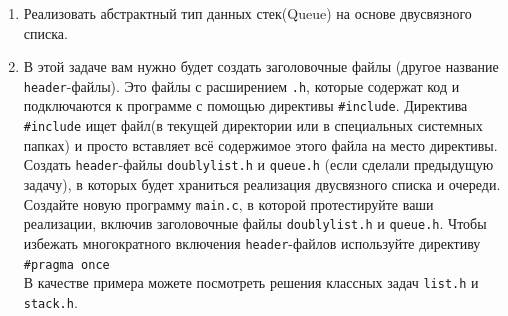 \documentclass{article}
\begin{document}
\begin{enumerate}
\item Реализовать абстрактный тип данных стек(Queue) на основе двусвязного списка.

\item В этой задаче вам нужно будет создать заголовочные файлы (другое название \texttt{header}-файлы). Это файлы с расширением \texttt{.h}, которые содержат код и подключаются к программе с помощью директивы \texttt{\#include}. Директива \texttt{\#include} ищет файл(в текущей директории или в специальных системных папках) и просто вставляет всё содержимое этого файла на место директивы.\\

Создать \texttt{header}-файлы \texttt{doublylist.h} и \texttt{queue.h} (если сделали предыдущую задачу), в которых будет храниться реализация двусвязного списка и очереди. Создайте новую программу \texttt{main.c}, в которой протестируйте ваши реализации, включив заголовочные файлы \texttt{doublylist.h} и \texttt{queue.h}. Чтобы избежать многократного включения \texttt{header}-файлов используйте директиву \\
\texttt{\#pragma once}\\

В качестве примера можете посмотреть решения классных задач \texttt{list.h} и \texttt{stack.h}.
\end{enumerate}
\end{document}
